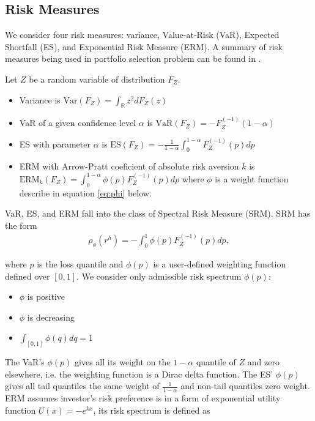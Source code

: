 \subsection{Risk Measures}\label{subsec:spectral-risk-measures}
We consider four risk measures: variance, Value-at-Risk (VaR), Expected Shortfall (ES), and Exponential Risk Measure (ERM).
A summary of risk measures being used in portfolio selection problem can be found in \citet{hardle2008applied}.\medskip
\medskip


Let $Z$ be a random variable of distribution $F_Z$.
\begin{itemize}
	\item Variance is $\text{Var}(F_Z) = \int_\mathbb{R}z^2 dF_Z(z)$
	\item VaR of a given confidence level $\alpha$ is $\text{VaR}(F_Z) = -F_{Z}^{(-1)}(1-\alpha)$
	\item ES with parameter $\alpha$ is $\text{ES}(F_Z) = -\frac{1}{1-\alpha}\int_0^{1-\alpha}F_Z^{(-1)}(p)dp$
	\item ERM with Arrow-Pratt coeficient of absolute risk aversion $k$ is $\text{ERM}_k(F_Z) = \int_0^{1-\alpha}\phi(p) F_Z^{(-1)}(p)dp$ where $\phi$ is a weight function describe in equation \ref{eq:phi} below.
	\end{itemize}\medskip

VaR, ES, and ERM fall into the class of Spectral Risk Measure (SRM).
SRM has the form \citep{Acerbi2002}%
\begin{align}
	\rho_\phi(r^h) = - \int_0^1 \phi(p) F_{Z}^{(-1)}(p)d p,
	\end{align}

where $p$ is the loss quantile and $\phi(p)$ is a user-defined weighting function defined over $[0,1]$. \medskip
We consider only admissible risk spectrum  $\phi(p)$:
\begin{itemize}
	\item $\phi$ is positive
	\item $\phi$ is decreasing
	\item $\int_{[0,1]}\phi(q)dq = 1$
	\end{itemize}\medskip

The VaR's $\phi(p)$ gives all its weight on the $1-\alpha$ quantile of $Z$ and zero elsewhere,
i.e. the weighting function is a Dirac delta function.
The ES' $\phi(p)$ gives all tail quantiles the same weight of $\frac{1}{1-\alpha}$ and non-tail quantiles zero weight.
ERM assumes investor's risk preference is in a form of exponential utility function $U(x)=-e^{kx}$,
its risk spectrum is defined as

